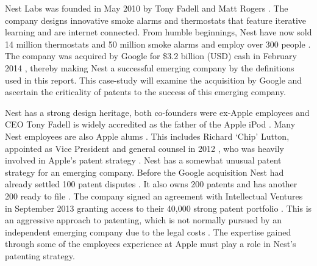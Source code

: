 {}

Nest Labs was founded in May 2010 by Tony Fadell and Matt Rogers \cite{NestFactsheet}.
The company designs innovative smoke alarms and thermostats that feature iterative learning and are internet connected.
From humble beginnings, Nest have now sold 14 million thermostats and 50 million smoke alarms and employ over 300 people \cite{NestFactsheet}.
The company was acquired by Google for \$3.2 billion (USD) cash \cite{NestReuters} in February 2014 \cite{NestFactsheet}, thereby making Nest a successful emerging company by the definitions used in this report.
This case-study will examine the acquisition by Google and ascertain the criticality of patents to the success of this emerging company.

Nest has a strong design heritage, both co-founders were ex-Apple employees and CEO Tony Fadell is widely accredited as the father of the Apple iPod \cite{NestAppleInsider}.
Many Nest employees are also Apple alums \cite{NestReuters}.
This includes Richard `Chip' Lutton, appointed as Vice President and general counsel in 2012 \cite{NestAppleInsider}, who was heavily involved in Apple's patent strategy \cite{NestReuters}.
Nest has a somewhat unusual patent strategy for an emerging company.
Before the Google acquisition Nest had already settled 100 patent disputes \cite{NestCoLabs}.
It also owns 200 patents and has another 200 ready to file \cite{NestCoLabs, NestIV}.
The company signed an agreement with Intellectual Ventures in September 2013 granting access to their 40,000 strong patent portfolio \cite{NestIV}.
This is an aggressive approach to patenting, which is not normally pursued by an independent emerging company due to the legal costs \cite{zahra1996technology}.
The expertise gained through some of the employees experience at Apple must play a role in Nest's patenting strategy.

